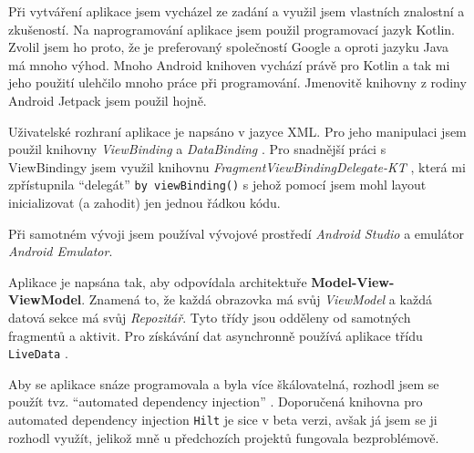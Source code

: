 \documentclass[../TakeYourPill.tex]{subfiles}
\begin{document}
Při vytváření aplikace jsem vycházel ze zadání a využil jsem vlastních znalostní a zkušeností. Na naprogramování aplikace jsem použil programovací jazyk Kotlin. Zvolil jsem ho proto, že je preferovaný společností Google a oproti jazyku Java má mnoho výhod. Mnoho Android knihoven vychází právě pro Kotlin a tak mi jeho použití ulehčilo mnoho práce při programování. Jmenovitě knihovny z rodiny Android Jetpack \cite{jetpack} jsem použil hojně.

Uživatelské rozhraní aplikace je napsáno v jazyce XML. Pro jeho manipulaci jsem použil knihovny \textit{ViewBinding} \cite{viewbinding} a \textit{DataBinding} \cite{databinding}. Pro snadnější práci s ViewBindingy jsem využil knihovnu \textit{FragmentViewBindingDelegate-KT} \cite{delegate}\cite{delegate2}, která mi zpřístupnila \enquote{delegát} \texttt{by viewBinding()} s jehož pomocí jsem mohl layout inicializovat (a zahodit) jen jednou řádkou kódu.

Při samotném vývoji jsem používal vývojové prostředí \textit{Android Studio} \cite{studio} a emulátor \textit{Android Emulator}.

Aplikace je napsána tak, aby odpovídala architektuře \textbf{Model-View-ViewModel}. Znamená to, že každá obrazovka má svůj \textit{ViewModel} a každá datová sekce má svůj \textit{Repozitář}. Tyto třídy jsou odděleny od samotných fragmentů a aktivit. Pro získávání dat asynchronně používá aplikace třídu \texttt{LiveData} \cite{livedata}.






Aby se aplikace snáze programovala a byla více škálovatelná, rozhodl jsem se použít tvz. \enquote{automated dependency injection} \cite{di}. Doporučená knihovna pro automated dependency injection \texttt{Hilt} \cite{hilt} je sice v beta verzi, avšak já jsem se ji rozhodl využít, jelikož mně u předchozích projektů fungovala bezproblémově.


\end{document}
